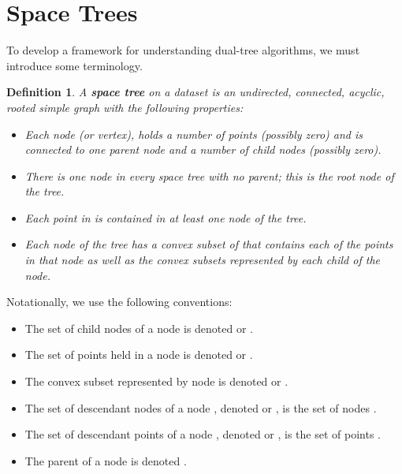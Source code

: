 \documentclass{article}
\newtheorem{defn}{Definition}
\begin{document}
\section{Space Trees}
\label{sec:trees}

To develop a framework for understanding dual-tree algorithms, we must
introduce some terminology.

\begin{defn}
\label{def:spacetree}
A \textbf{space tree} on a dataset  is an undirected,
connected, acyclic, rooted simple graph with the following properties:

\vspace*{-0.5em}
\begin{itemize}
  \item Each \textit{node} (or vertex), holds a number of points (possibly
zero) and is connected to one parent node and a number of child nodes (possibly
zero).
  \item There is one node in every space tree with no parent; this
is the \textit{root node} of the tree.
  \item Each point in  is contained in at least one node of the
tree.
  \item Each node  of the tree has a convex subset of
 that contains each of the points in that node as well as the convex
subsets represented by each child of the node.
\end{itemize}
\end{defn}

\vspace*{-0.6em}
Notationally, we use the following conventions:
\vspace*{-0.5em}

\begin{itemize}
  \item The set of child nodes of a node  is denoted
 or .
  \item The set of points held in a node  is denoted
 or .
  \item The convex subset represented by node  is denoted
 or .
  \item The set of descendant nodes of a node , denoted
 or , is the set of nodes
 .
  \item The set of descendant points of a node , denoted
 or , is the set of points .
  \item The parent of a node  is denoted
.
\end{itemize}

\vspace*{-0.6em}
\end{document}
